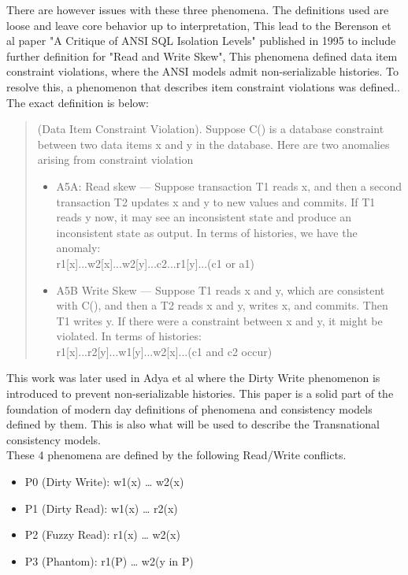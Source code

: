 \documentclass[a4paper,10pt,titlepage]{report}
\begin{document}
There are however issues with these three phenomena. The definitions used are loose and leave core behavior up to interpretation, This lead to the Berenson et al\cite{Berensonetal} paper "A Critique of ANSI SQL Isolation Levels" published in 1995 to include further definition for "Read and Write Skew", This phenomena defined data item constraint violations, where the ANSI models admit non-serializable histories. To resolve this, a phenomenon that describes item constraint violations was defined.. The exact definition is below: \\
\begin{quote}
    (Data Item Constraint Violation). Suppose C() is a database constraint between two data items x and y in the database. Here are two anomalies arising from constraint violation
\begin{itemize}
\item A5A: Read skew — Suppose transaction T1 reads x, and then a second transaction T2 updates x and y to new values and commits. If T1 reads y now, it may see an inconsistent state and produce an inconsistent state as output.
In terms of histories, we have the anomaly:   \\
 r1[x]...w2[x]...w2[y]...c2...r1[y]...(c1 or a1)
 
\item A5B Write Skew — Suppose T1 reads x and y, which are
consistent with C(), and then a T2 reads x and y, writes x,
    and commits. Then T1 writes y. If there were a constraint
    between x and y, it might be violated. In terms of histories: \\
r1[x]...r2[y]...w1[y]...w2[x]...(c1 and c2 occur)
    
\end{itemize}
\end{quote}

This work was later used in Adya et al\cite{Adya99weakconsistency} where the Dirty Write phenomenon is introduced to prevent non-serializable histories. This paper is a solid part of the foundation of modern day definitions of phenomena and consistency models defined by them. This is also what will be used to describe the Transnational consistency models.\\

These 4 phenomena are defined by the following Read/Write conflicts.
\begin{itemize}
    \item P0 (Dirty Write): w1(x) … w2(x)
    \item P1 (Dirty Read): w1(x) … r2(x)
    \item P2 (Fuzzy Read): r1(x) … w2(x)
    \item P3 (Phantom): r1(P) … w2(y in P)
\end{itemize}
\end{document}
